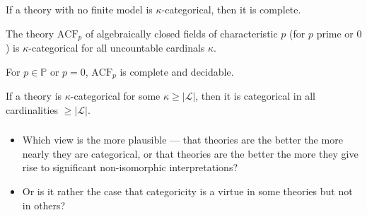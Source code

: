 \documentclass[UTF8,11pt,colorlinks,compress,openany]{beamer}%
\begin{document}
\begin{frame}\frametitle{}
	\begin{theorem}
		If a theory with no finite model is $\kappa$-categorical, then it is complete.
	\end{theorem}
	\begin{theorem}
	The theory $\mathrm{ACF}_p$ of algebraically closed fields of characteristic $p$ (for $p$ prime or $0$) is $\kappa$-categorical for all uncountable cardinals $\kappa$.
	\end{theorem}
	\begin{corollary}
	For $p\in\mathbb{P}$ or $p=0$, $\mathrm{ACF}_p$ is complete and decidable.
	\end{corollary}
	\begin{theorem}
		If a theory is $\kappa$-categorical for some $\kappa\geq|\mathscr{L}|$, then it is categorical in all cardinalities $\geq|\mathscr{L}|$.
	\end{theorem}
\end{frame}

\begin{frame}\frametitle{}
\begin{problem}
\begin{itemize}
	\item Which view is the more plausible --- that theories are the better the more nearly they are categorical, or that theories are the better the more they give rise to significant non-isomorphic interpretations?
	\item Or is it rather the case that categoricity is a virtue in some theories but not in others?
\end{itemize}
\end{problem}
\end{frame}
\end{document}
